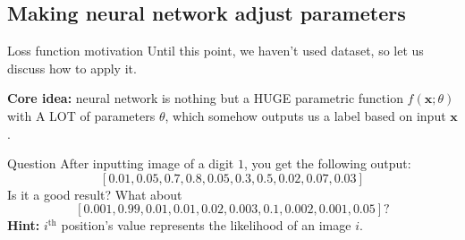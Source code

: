 \documentclass{beamer}
\begin{document}
    \subsection{Making neural network adjust parameters}
    \begin{frame}{Loss function motivation}
        Until this point, we haven't used dataset, so let us discuss how to apply it.
    
        \textbf{Core idea:} neural network is nothing but a HUGE parametric function $f(\mathbf{x};\theta)$ with A LOT of parameters $\theta$, which somehow outputs us a label based on input $\mathbf{x}$. \pause

        \begin{exampleblock}{Question}
        After inputting image of a digit $1$, you get the following output:
        \[
        [0.01, 0.05, 0.7, 0.8, 0.05, 0.3, 0.5, 0.02, 0.07, 0.03]
        \]
        Is it a good result? What about
        \[
        [0.001, 0.99, 0.01, 0.01, 0.02, 0.003, 0.1, 0.002, 0.001, 0.05]?
        \]
        \textbf{Hint:} $i^{\text{th}}$ position's value represents the likelihood of an image $i$.
        \end{exampleblock}
    \end{frame}
\end{document}
